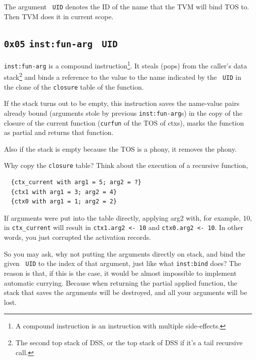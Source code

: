 \documentclass{report}
\newcommand{\mtilde}[1]{\textasciitilde}
\newcommand{\marg}[1]{\texttt{\mtilde ~#1}}
\newcommand{\inst}[1] {\texttt{inst:#1}}
\begin{document}
The argument \marg{UID} denotes the ID of the name that the TVM will bind TOS to. Then TVM does it in current scope.

\subsection{\texttt{0x05} \inst{fun-arg} \marg{UID}}

\inst{fun-arg} is a compound instruction\footnote{A compound instruction is an instruction with multiple side-effects.}. It steals (pops) from the caller's data stack\footnote{The second top stack of DSS, or the top stack of DSS if it's a tail recursive call.} and binds a reference to the value to the name indicated by the \marg{UID} in the clone of the \texttt{closure} table of the function.

\begin{mdframed}[style=detail]
  If the stack turns out to be empty, this instruction saves the
  name-value pairs already bound (arguments stole by previous
  \inst{fun-arg}s) in the copy of the closure of the current function
  (\texttt{curfun} of the TOS of ctxs), marks the function as partial
  and returns that function.

  Also if the stack is empty because the TOS is a phony, it removes the
  phony.
\end{mdframed}

\begin{mdframed}[style=hint]
  Why copy the \texttt{closure} table? Think about the execution of a recursive function,

\begin{verbatim}
  {ctx_current with arg1 = 5; arg2 = ?}
  {ctx1 with arg1 = 3; arg2 = 4}
  {ctx0 with arg1 = 1; arg2 = 2}
\end{verbatim}

If arguments were put into the table directly, applying arg2 with, for example, 10, in \texttt{ctx\_current} will result in \texttt{ctx1.arg2 <- 10} and \texttt{ctx0.arg2 <- 10}. In other words, you just corrupted the activation records.

So you may ask, why not putting the arguments directly on stack, and bind the given \marg{UID} to the index of that argument, just like what \inst{bind} does? The reason is that, if this is the case, it would be almost impossible to implement automatic currying. Because when returning the partial applied function, the stack that saves the arguments will be destroyed, and all your arguments will be lost.
\end{mdframed}
\end{document}
